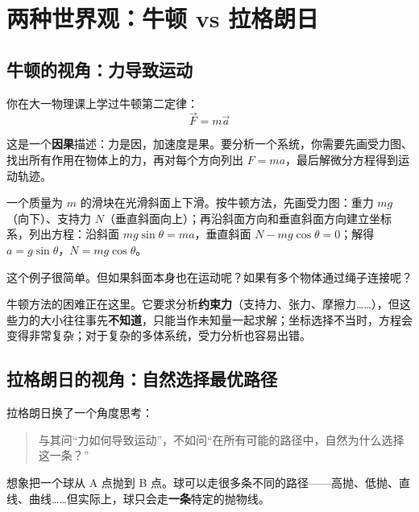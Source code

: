 \section{两种世界观：牛顿 vs 拉格朗日}

\subsection{牛顿的视角：力导致运动}


你在大一物理课上学过牛顿第二定律：
\[
\vec{F} = m\vec{a}
\]

这是一个\textbf{因果}描述：力是因，加速度是果。要分析一个系统，你需要先画受力图、找出所有作用在物体上的力，再对每个方向列出 $F = ma$，最后解微分方程得到运动轨迹。

\begin{example}[斜面上的滑块]
一个质量为 $m$ 的滑块在光滑斜面上下滑。按牛顿方法，先画受力图：重力 $mg$（向下）、支持力 $N$（垂直斜面向上）；再沿斜面方向和垂直斜面方向建立坐标系，列出方程：沿斜面 $mg\sin\theta = ma$，垂直斜面 $N - mg\cos\theta = 0$；解得 $a = g\sin\theta$，$N = mg\cos\theta$。

这个例子很简单。但如果斜面本身也在运动呢？如果有多个物体通过绳子连接呢？
\end{example}

牛顿方法的困难正在这里。它要求分析\textbf{约束力}（支持力、张力、摩擦力……），但这些力的大小往往事先\textbf{不知道}，只能当作未知量一起求解；坐标选择不当时，方程会变得非常复杂；对于复杂的多体系统，受力分析也容易出错。

\subsection{拉格朗日的视角：自然选择最优路径}

拉格朗日换了一个角度思考：

\begin{quote}
与其问“力如何导致运动”，不如问“在所有可能的路径中，自然为什么选择这一条？”
\end{quote}

想象把一个球从 A 点抛到 B 点。球可以走很多条不同的路径——高抛、低抛、直线、曲线……但实际上，球只会走\textbf{一条}特定的抛物线。

